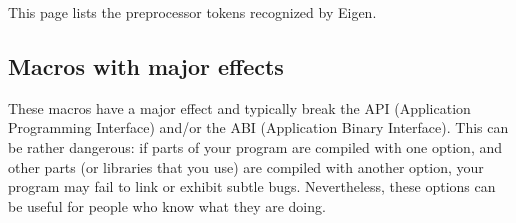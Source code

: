 This page lists the preprocessor tokens recognized by Eigen.\hypertarget{_topic_preprocessor_directives_TopicPreprocessorDirectivesMajor}{}\subsection{Macros with major effects}\label{_topic_preprocessor_directives_TopicPreprocessorDirectivesMajor}
These macros have a major effect and typically break the A\+PI (Application Programming Interface) and/or the A\+BI (Application Binary Interface). This can be rather dangerous\+: if parts of your program are compiled with one option, and other parts (or libraries that you use) are compiled with another option, your program may fail to link or exhibit subtle bugs. Nevertheless, these options can be useful for people who know what they are doing.


